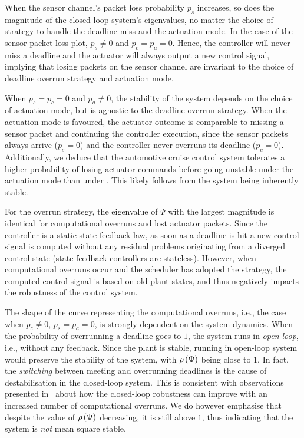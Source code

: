 When the sensor channel's packet loss probability $p_s$ increases, so does the magnitude of the closed-loop system's eigenvalues, no matter the choice of strategy to handle the deadline miss and the actuation mode.
In the case of the sensor packet loss plot, $p_s \neq 0$ and $p_c = p_a = 0$.
Hence, the controller will never miss a deadline and the actuator will always output a new control signal, implying that losing packets on the sensor channel are invariant to the choice of deadline overrun strategy and actuation mode.

When $p_s = p_c=0$ and $p_a \neq 0$, the stability of the system depends on the choice of actuation mode, but is agnostic to the deadline overrun strategy.
When the \tH{} actuation mode is favoured, the actuator outcome is comparable to missing a sensor packet and continuing the controller execution, since the sensor packets always arrive ($p_s=0$) and the controller never overruns its deadline ($p_c=0$).
Additionally, we deduce that the automotive cruise control system tolerates a higher probability of losing actuator commands before going unstable under the \tZ{} actuation mode than under \tH{}.
This likely follows from the system being inherently stable.

For the \tK{} overrun strategy, the eigenvalue of $\Psi$ with the largest magnitude is identical for computational overruns and lost actuator packets.
Since the controller is a static state-feedback law, as soon as a deadline is hit a new control signal is computed without any residual problems originating from a diverged control state (state-feedback controllers are stateless).
However, when computational overruns occur and the scheduler has adopted the \tS{} strategy, the computed control signal is based on old plant states, and thus negatively impacts the robustness of the control system.

The shape of the curve representing the computational overruns, i.e., the case when $p_c \neq 0$, $p_s = p_a = 0$, is strongly dependent on the system dynamics.
When the probability of overrunning a deadline goes to $1$, the system runs in \emph{open-loop}, i.e., without any feedback.
Since the plant is stable, running in open-loop system would preserve the stability of the system, with $\rho\left( \Psi \right)$ being close to $1$.
In fact, the \emph{switching} between meeting and overrunning deadlines is the cause of destabilisation in the closed-loop system.
This is consistent with observations presented in~\cite{Vreman:2021} about how the closed-loop robustness can improve with an increased number of computational overruns.
We do however emphasise that despite the value of $\rho\left( \Psi \right)$ decreasing, it is still above $1$, thus indicating that the system is \emph{not} mean square stable.

